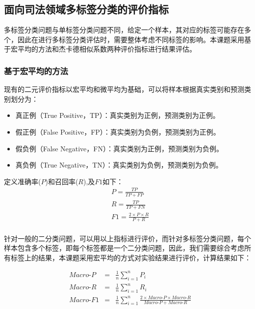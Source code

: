 \subsection{面向司法领域多标签分类的评价指标}
多标签分类问题与单标签分类问题不同，给定一个样本，其对应的标签可能存在多个，因此在进行多标签分类评估时，需要整体考虑不同标签的影响。本课题采用基于宏平均的方法和杰卡德相似系数两种评价指标进行结果评估。
\subsubsection{基于宏平均的方法}
现有的二元评价指标以宏平均和微平均为基础，可以将样本根据真实类别和预测类别划分为：
\begin{itemize}
    \item 真正例（True Positive，TP）：真实类别为正例，预测类别为正例。
    \item 假正例（False Positive，FP）：真实类别为负例，预测类别为正例。
    \item 假负例（False Negative，FN）：真实类别为正例，预测类别为负例。
    \item 真负例（True Negative，TN）：真实类别为负例，预测类别为负例。
\end{itemize}

定义准确率($P$)和召回率($R$),及$F1$如下：
\begin{equation}
    \begin{aligned}
        &P=\frac{TP}{TP+FP}\\
        &R=\frac{TP}{TP+FN}\\
        &F1=\frac{2\times P \times R}{P+R}\\
    \end{aligned}
\end{equation}

针对一般的二分类问题，可以用以上指标进行评价，而针对多标签分类问题，每个样本包含多个标签，即每个标签都是一个二分类问题，因此，我们需要综合考虑所有标签上的结果，本课题采用宏平均的方式对实验结果进行评价，计算结果如下：

\begin{equation}
    \begin{aligned}
        & Macro\textrm{-}P &=& \frac{1}{n}\sum_{i=1}^{n}P_{i} \\
        & Macro\textrm{-}R &=& \frac{1}{n}\sum_{i=1}^{n}R_{i} \\
        & Macro\textrm{-}F1 &=& \frac{1}{n}\sum_{i=1}^{n}\frac{2\times Macro\textrm{-}P \times Macro\textrm{-}R}{Macro\textrm{-}P+Macro\textrm{-}R} \\
    \end{aligned}
\end{equation}

